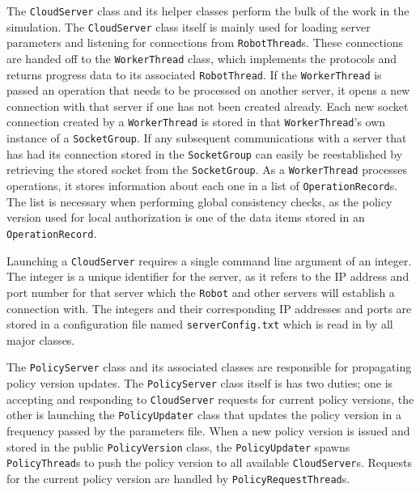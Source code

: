 \documentclass[11pt]{article}
\begin{document}
The \texttt{CloudServer} class and its helper classes perform the bulk of the work in the simulation. The \texttt{CloudServer} class itself is mainly used for loading server parameters and listening for connections from \texttt{RobotThread}s. These connections are handed off to the \texttt{WorkerThread} class, which implements the protocols and returns progress data to its associated \texttt{RobotThread}. If the \texttt{WorkerThread} is passed an operation that needs to be processed on another server, it opens a new connection with that server if one has not been created already. Each new socket connection created by a \texttt{WorkerThread} is stored in that \texttt{WorkerThread}'s own instance of a \texttt{SocketGroup}. If any subsequent communications with a server that has had its connection stored in the \texttt{SocketGroup} can easily be reestablished by retrieving the stored socket from the \texttt{SocketGroup}. As a \texttt{WorkerThread} processes operations, it stores information about each one in a list of \texttt{OperationRecord}s. The list is necessary when performing global consistency checks, as the policy version used for local authorization is one of the data items stored in an \texttt{OperationRecord}.

Launching a \texttt{CloudServer} requires a single command line argument of an integer. The integer is a unique identifier for the server, as it refers to the IP address and port number for that server which the \texttt{Robot} and other servers will establish a connection with. The integers and their corresponding IP addresses and ports are stored in a configuration file named \texttt{serverConfig.txt} which is read in by all major classes.

The \texttt{PolicyServer} class and its associated classes are responsible for propagating policy version updates. The \texttt{PolicyServer} class itself is has two duties; one is accepting and responding to \texttt{CloudServer} requests for current policy versions, the other is launching the \texttt{PolicyUpdater} class that updates the policy version in a frequency passed by the parameters file. When a new policy version is issued and stored in the public \texttt{PolicyVersion} class, the \texttt{PolicyUpdater} spawns \texttt{PolicyThread}s to push the policy version to all available \texttt{CloudServer}s. Requests for the current policy version are handled by \texttt{PolicyRequestThread}s.
\end{document}
